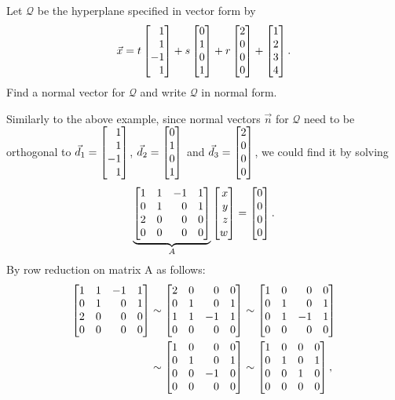 \begin{example}
	Let $\mathcal Q$ be the hyperplane specified in vector form by
	\[
		\vec x=t\mat{1\\1\\-1\\1}+s\mat{0\\1\\0\\1}+r\mat{2\\0\\0\\0}+\mat{1\\2\\3\\4}.
	\]
	Find a normal vector for $\mathcal Q$ and write $\mathcal Q$ in normal form.

	Similarly to the above example, since normal vectors $\vec n$ for $\mathcal Q$ need to be orthogonal to $\vec d_1=\mat{1\\1\\-1\\1}$, $\vec d_2=\mat{0\\1\\0\\1}$ and $\vec d_3=\mat{2\\0\\0\\0}$, we could find it by solving
	\[
	\underbrace{\mat{1&1&-1&1\\0&1&0&1\\2&0&0&0\\0&0&0&0}}_A\mat{x\\y\\z\\w}=\mat{0\\0\\0\\0}.
    \]
    By row reduction on matrix A as follows:
    \begin{align*}
        \mat{1&1&-1&1\\0&1&0&1\\2&0&0&0\\0&0&0&0} 
        &\sim \mat{2&0&0&0\\0&1&0&1\\1&1&-1&1\\0&0&0&0}\sim \mat{1&0&0&0\\0&1&0&1\\0&1&-1&1\\0&0&0&0} \\
        &\sim \mat{1&0&0&0\\0&1&0&1\\0&0&-1&0\\0&0&0&0}\sim \mat{1&0&0&0\\0&1&0&1\\0&0&1&0\\0&0&0&0},

\end{align*}
\end{example}
